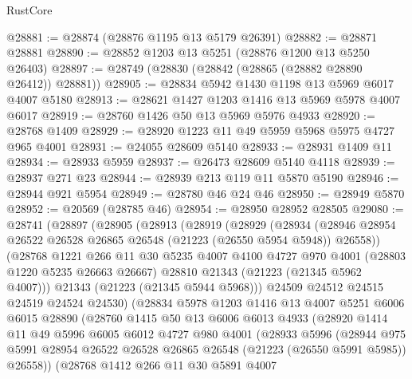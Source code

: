 \begin{lexlean}{RustCore}
\begin{coremodule}
@28881 := @28874 (@28876 @1195 @13 @5179 @26391)
@28882 := @28871 @28881
@28890 := @28852 @1203 @13 @5251 (@28876 @1200 @13 @5250 @26403)
@28897 := @28749 (@28830 (@28842 (@28865 (@28882 @28890 @26412)) @28881))
@28905 := @28834 @5942 @1430 @1198 @13 @5969 @6017 @4007 @5180
@28913 := @28621 @1427 @1203 @1416 @13 @5969 @5978 @4007 @6017
@28919 := @28760 @1426 @50 @13 @5969 @5976 @4933
@28920 := @28768 @1409
@28929 := @28920 @1223 @11 @49 @5959 @5968 @5975 @4727 @965 @4001
@28931 := @24055 @28609 @5140
@28933 := @28931 @1409 @11
@28934 := @28933 @5959
@28937 := @26473 @28609 @5140 @4118
@28939 := @28937 @271 @23
@28944 := @28939 @213 @119 @11 @5870 @5190
@28946 := @28944 @921 @5954
@28949 := @28780 @46 @24 @46
@28950 := @28949 @5870
@28952 := @20569 (@28785 @46)
@28954 := @28950 @28952 @28505
@29080 := @28741
    (@28897
      (@28905
        (@28913
          (@28919
            (@28929
              (@28934
                (@28946 @28954 @26522 @26528 @26865 @26548 (@21223 (@26550 @5954 @5948)) @26558))
              (@28768
                @1221
                @266
                @11
                @30
                @5235
                @4007
                @4100
                @4727
                @970
                @4001
                (@28803 @1220 @5235 @26663 @26667)
                @28810
                @21343
                (@21223 (@21345 @5962 @4007)))
              @21343
              (@21223 (@21345 @5944 @5968)))
            @24509
            @24512
            @24515
            @24519
            @24524
            @24530)
          (@28834
            @5978
            @1203
            @1416
            @13
            @4007
            @5251
            @6006
            @6015
            @28890
            (@28760
              @1415
              @50
              @13
              @6006
              @6013
              @4933
              (@28920
                @1414
                @11
                @49
                @5996
                @6005
                @6012
                @4727
                @980
                @4001
                (@28933
                  @5996
                  (@28944
                    @975
                    @5991
                    @28954
                    @26522
                    @26528
                    @26865
                    @26548
                    (@21223 (@26550 @5991 @5985))
                    @26558))
                (@28768
                  @1412
                  @266
                  @11
                  @30
                  @5891
                  @4007

\end{coremodule}
\end{lexlean}
